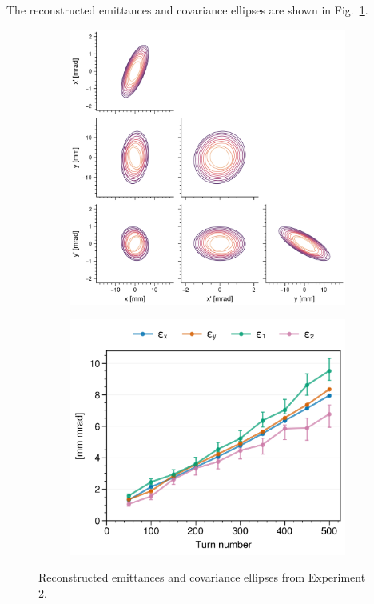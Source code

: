 The reconstructed emittances and covariance ellipses are shown in Fig.~\ref{fig:exp2_emittances}.
%
\begin{figure}[!p]
    \centering
    \begin{subfigure}{0.6\textwidth}
        \includegraphics[width=\textwidth]{Images/chapter5/exp2/corner.png}
    \end{subfigure}
    \hfill
    \begin{subfigure}[t]{0.39\textwidth}
        \includegraphics[width=\textwidth]{Images/chapter5/exp2/emittances.png}
    \end{subfigure}
    \caption{Reconstructed emittances and covariance ellipses from Experiment 2.}
    \label{fig:exp2_emittances}
\end{figure}
